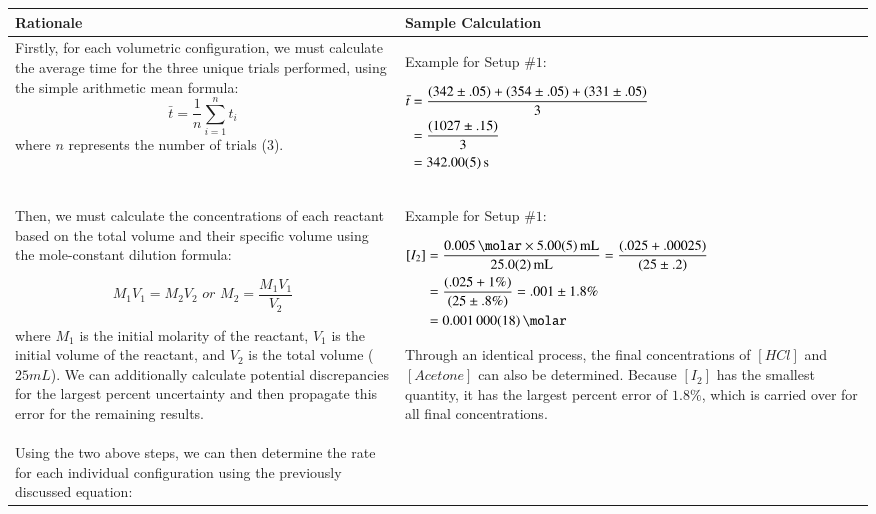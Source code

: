 \begin{table}[h!]
\centering

\begin{tabularx}{\textwidth}{|X|X|}
\hline 
 Rationale & Sample Calculation\\
 \hline
	Firstly, for each volumetric configuration, we must calculate the average time for the three unique trials performed, using the simple arithmetic mean formula:
	\[\bar{t}={\frac {1}{n}}\sum _{i=1}^{n}t_{i}\]
	where $n$ represents the number of trials ($3$).	
	& 
	Example for Setup $\# 1$: \newline

	{$\!\begin{aligned}
	\bar{t} &= \frac{(342 \pm .05) + (354 \pm .05) + (331 \pm .05)}{3} \\
	&= \frac{(1027 \pm .15)}{3} \\
	&= \SI{342 \pm .05}{\second}
	\end{aligned}$} \\
  \hline
Then, we must calculate the concentrations of each reactant based on the total volume and their specific volume using the mole-constant dilution formula:

\[M_1V_1 = M_2V_2 \textit{ or } M_2 = \frac{M_1V_1}{V_2} \]

where $M_1$ is the initial molarity of the reactant, $V_1$ is the initial volume of the reactant, and $V_2$ is the total volume ($25 mL$). We can additionally calculate potential discrepancies for the largest percent uncertainty and then propagate this error for the remaining results.
	& 
	Example for Setup $\# 1$: \newline

	{$\!\begin{aligned}
	\left[I_2\right] &= \frac{\SI{.005}{\molar} \times \SI{5 \pm .05}{\milli\liter}}{\SI{25 \pm .2}{\milli\liter}} = \frac{(.025 + .00025)}{(25 \pm .2)} \\
	&= \frac{(.025 + 1\%)}{(25 \pm .8\%)} = .001 \pm 1.8\% \\
	&= \SI{.001 \pm .000018}{\molar} 
	\end{aligned}$} 

Through an identical process, the final concentrations of $[HCl]$ and $[Acetone]$ can also be determined. Because $[I_2]$ has the smallest quantity, it has the largest percent error of $1.8\%$, which is carried over for all final concentrations. \\
\hline

Using the two above steps, we can then determine the rate for each individual configuration using the previously discussed equation:


\end{tabularx}
\end{table}
